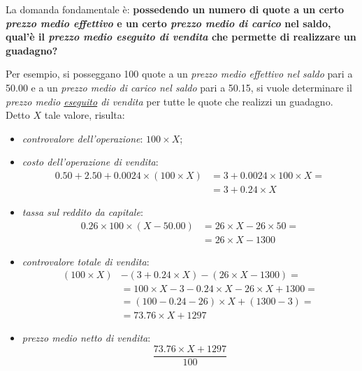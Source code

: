 \documentclass[12pt,a4paper]{article}
\newcommand{\Eur}[1]{\SI{#1}{\text{\euro{}}}}
\begin{document}

La  domanda  fondamentale  è:  \textbf{possedendo  un numero  di  quote  a  un  certo
   \emph{prezzo medio effettivo} e un certo  \emph{prezzo medio di carico} nel saldo,
   qual'è il  \emph{prezzo medio eseguito di  vendita} che permette di  realizzare un
   guadagno?}

Per esempio,  si posseggano  \num{100} quote  a un  \emph{prezzo medio  effettivo nel
   saldo} pari a  \Eur{50,00} e a un  \emph{prezzo medio di carico nel  saldo} pari a
\Eur{50,15},  si  vuole determinare  il  \emph{prezzo  medio \underline{eseguito}  di
   vendita} per  tutte le quote che  realizzi un guadagno.  Detto  \(X\) tale valore,
risulta:
\begin{itemize}
\item \emph{controvalore dell'operazione}: \(\num{100} \times{} X\);
\item \emph{costo dell'operazione di vendita}:
  \begin{align*}
    \num{0,50} + \num{2,50} + \num{0,0024} \times{} (\num{100} \times{} X)
    &= \num{3} + \num{0,0024} \times{} \num{100} \times{} X = \\
    &= \num{3} + \num{0,24} \times{} X
  \end{align*}
\item \emph{tassa sul reddito da capitale}:
  \begin{align*}
    \num{0,26} \times{} \num{100} \times{} (X - \num{50,00})
    &= \num{26} \times{} X - \num{26} \times{} \num{50} = \\
    &= \num{26} \times{} X - \num{1300}
  \end{align*}
\item \emph{controvalore totale di vendita}:
  \begin{align*}
    (\num{100} \times{} X)
    &- (\num{3} + \num{0,24} \times{} X)
      - (\num{26} \times{} X - \num{1300})
      = \\
    &= \num{100} \times{} X
      - \num{3} - \num{0,24} \times{} X
      - \num{26} \times{} X + \num{1300}
      = \\
    &= (\num{100} - \num{0,24} - \num{26}) \times{} X + (\num{1300} - \num{3})
      = \\
    &= \num{73,76} \times{} X + \num{1297}
  \end{align*}
\item \emph{prezzo medio netto di vendita}:
  \begin{equation*}
    \frac{\num{73,76} \times{} X + \num{1297}}{100}
  \end{equation*}
\end{itemize}
\end{document}
